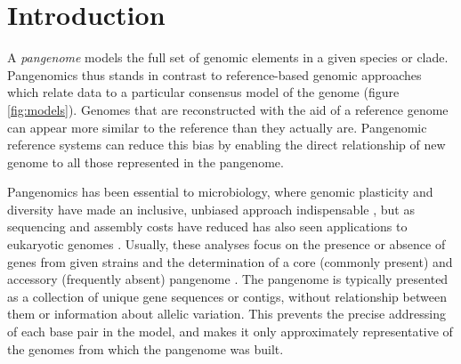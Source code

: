 \section{Introduction}  
\label{sec:intro}

A \emph{pangenome} models the full set of genomic elements in a given species or clade.
Pangenomics thus stands in contrast to reference-based genomic approaches which relate data to a particular consensus model of the genome (figure \ref{fig:models}).
Genomes that are reconstructed with the aid of a reference genome can appear more similar to the reference than they actually are.
Pangenomic reference systems can reduce this bias by enabling the direct relationship of new genome to all those represented in the pangenome.



Pangenomics has been essential to microbiology, where genomic plasticity and diversity have made an inclusive, unbiased approach indispensable \cite{Vernikos2015}, but as sequencing and assembly costs have reduced has also seen applications to eukaryotic genomes \cite{cao2011whole,gao2019tomato,Ou_2018}.
Usually, these analyses focus on the presence or absence of genes from given strains and the determination of a core (commonly present) and accessory (frequently absent) pangenome \cite{page2015roary}.
The pangenome is typically presented as a collection of unique gene sequences or contigs, without relationship between them or information about allelic variation.
This prevents the precise addressing of each base pair in the model, and makes it only approximately representative of the genomes from which the pangenome was built.

